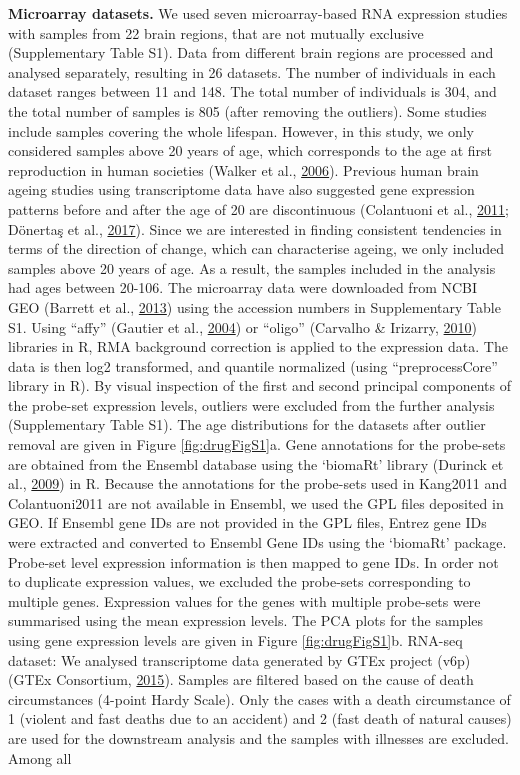 \documentclass[12pt,twoside]{unicam}
\begin{document}
\textbf{Microarray datasets.} We used seven microarray-based RNA expression studies with samples from 22 brain regions, that are not mutually exclusive (Supplementary Table S1). Data from different brain regions are processed and analysed separately, resulting in 26 datasets. The number of individuals in each dataset ranges between 11 and 148. The total number of individuals is 304, and the total number of samples is 805 (after removing the outliers). Some studies include samples covering the whole lifespan. However, in this study, we only considered samples above 20 years of age, which corresponds to the age at first reproduction in human societies (Walker et al., \protect\hyperlink{ref-Walker2006}{2006}). Previous human brain ageing studies using transcriptome data have also suggested gene expression patterns before and after the age of 20 are discontinuous (Colantuoni et al., \protect\hyperlink{ref-Colantuoni2011}{2011}; Dönertaş et al., \protect\hyperlink{ref-Donertas2017}{2017}). Since we are interested in finding consistent tendencies in terms of the direction of change, which can characterise ageing, we only included samples above 20 years of age. As a result, the samples included in the analysis had ages between 20-106. The microarray data were downloaded from NCBI GEO (Barrett et al., \protect\hyperlink{ref-Barrett2013}{2013}) using the accession numbers in Supplementary Table S1. Using ``affy'' (Gautier et al., \protect\hyperlink{ref-Gautier2004}{2004}) or ``oligo'' (Carvalho \& Irizarry, \protect\hyperlink{ref-Carvalho2010}{2010}) libraries in R, RMA background correction is applied to the expression data. The data is then log2 transformed, and quantile normalized (using ``preprocessCore'' library in R). By visual inspection of the first and second principal components of the probe-set expression levels, outliers were excluded from the further analysis (Supplementary Table S1). The age distributions for the datasets after outlier removal are given in Figure \ref{fig:drugFigS1}a. Gene annotations for the probe-sets are obtained from the Ensembl database using the `biomaRt' library (Durinck et al., \protect\hyperlink{ref-Durinck2009}{2009}) in R. Because the annotations for the probe-sets used in Kang2011 and Colantuoni2011 are not available in Ensembl, we used the GPL files deposited in GEO. If Ensembl gene IDs are not provided in the GPL files, Entrez gene IDs were extracted and converted to Ensembl Gene IDs using the `biomaRt' package. Probe-set level expression information is then mapped to gene IDs. In order not to duplicate expression values, we excluded the probe-sets corresponding to multiple genes. Expression values for the genes with multiple probe-sets were summarised using the mean expression levels. The PCA plots for the samples using gene expression levels are given in Figure \ref{fig:drugFigS1}b. RNA-seq dataset: We analysed transcriptome data generated by GTEx project (v6p) (GTEx Consortium, \protect\hyperlink{ref-GTEx_Consortium2015}{2015}). Samples are filtered based on the cause of death circumstances (4-point Hardy Scale). Only the cases with a death circumstance of 1 (violent and fast deaths due to an accident) and 2 (fast death of natural causes) are used for the downstream analysis and the samples with illnesses are excluded. Among all 
\end{document}
